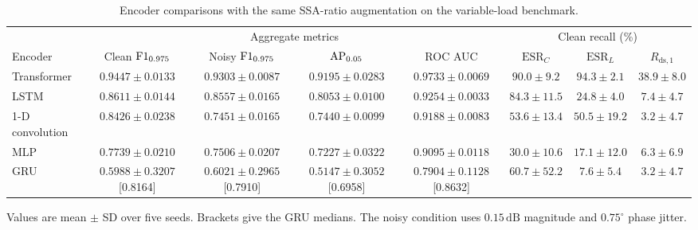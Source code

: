 \begin{table}[!ht]
\centering
\caption{Encoder comparisons with the same SSA-ratio augmentation on the variable-load benchmark.}
\label{tab:encoder_backbones}
\footnotesize
\setlength{\tabcolsep}{3pt}
\renewcommand{\arraystretch}{1.17}
\begin{tabular*}{\textwidth}{@{\extracolsep{\fill}}lccccccc@{}}
\toprule
& \multicolumn{4}{c}{Aggregate metrics} & \multicolumn{3}{c}{Clean recall (\%)} \\
\cmidrule(lr){2-5}\cmidrule(l){6-8}
Encoder & Clean $\mathrm{F1}_{0.975}$ & Noisy $\mathrm{F1}_{0.975}$ & $\mathrm{AP}_{0.05}$ & ROC AUC & $\mathrm{ESR}_C$ & $\mathrm{ESR}_L$ & $R_{\mathrm{ds},1}$ \\
\midrule
Transformer & $0.9447 \pm 0.0133$ & $0.9303 \pm 0.0087$ & $0.9195 \pm 0.0283$ & $0.9733 \pm 0.0069$ & $90.0 \pm 9.2$ & $94.3 \pm 2.1$ & $38.9 \pm 8.0$ \\
LSTM & $0.8611 \pm 0.0144$ & $0.8557 \pm 0.0165$ & $0.8053 \pm 0.0100$ & $0.9254 \pm 0.0033$ & $84.3 \pm 11.5$ & $24.8 \pm 4.0$ & $7.4 \pm 4.7$ \\
1-D convolution & $0.8426 \pm 0.0238$ & $0.7451 \pm 0.0165$ & $0.7440 \pm 0.0099$ & $0.9188 \pm 0.0083$ & $53.6 \pm 13.4$ & $50.5 \pm 19.2$ & $3.2 \pm 4.7$ \\
MLP & $0.7739 \pm 0.0210$ & $0.7506 \pm 0.0207$ & $0.7227 \pm 0.0322$ & $0.9095 \pm 0.0118$ & $30.0 \pm 10.6$ & $17.1 \pm 12.0$ & $6.3 \pm 6.9$ \\
GRU & \shortstack{$0.5988 \pm 0.3207$\\{\scriptsize [0.8164]}} & \shortstack{$0.6021 \pm 0.2965$\\{\scriptsize [0.7910]}} & \shortstack{$0.5147 \pm 0.3052$\\{\scriptsize [0.6958]}} & \shortstack{$0.7904 \pm 0.1128$\\{\scriptsize [0.8632]}} & $60.7 \pm 52.2$ & $7.6 \pm 5.4$ & $3.2 \pm 4.7$ \\
\bottomrule
\end{tabular*}
\par\smallskip\parbox{\textwidth}{Values are mean $\pm$ SD over five seeds. Brackets give the GRU medians. The noisy condition uses $0.15\,\mathrm{dB}$ magnitude and $0.75^\circ$ phase jitter.}
\end{table}
